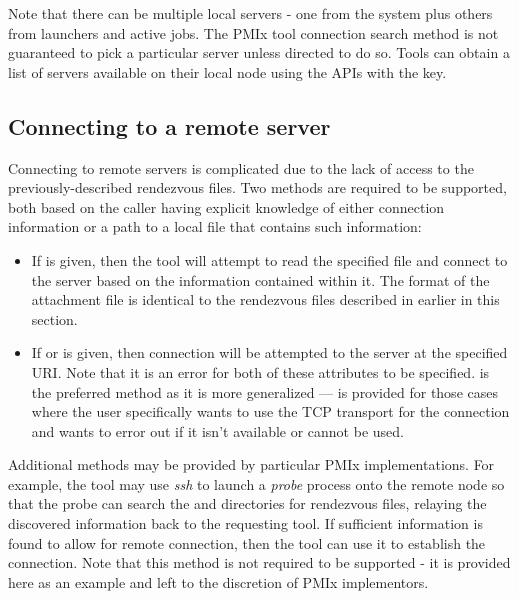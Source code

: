 Note that there can be multiple local servers - one from the system plus others from launchers and active jobs. The \ac{PMIx} tool connection search method is not guaranteed to pick a particular server unless directed to do so. Tools can obtain a list of servers available on their local node using the  \acp{API} with the  key.


\subsection{Connecting to a remote server}

Connecting to remote servers is complicated due to the lack of access to the previously-described rendezvous files. Two methods are required to be supported, both based on the caller having explicit knowledge of either connection information or a path to a local file that contains such information:


\begin{itemize}

\item If  is given, then the tool will attempt to read the specified file and connect to the server based on the information contained within it. The format of the attachment file is identical to the rendezvous files described in earlier in this section.

\item If  or  is given, then connection will be attempted to the server at the specified \ac{URI}. Note that it is an error for both of these attributes to be specified.  is the preferred method as it is more generalized —  is provided for those cases where the user specifically wants to use the \ac{TCP} transport for the connection and wants to error out if it isn’t available or cannot be used.

\end{itemize}

Additional methods may be provided by particular \ac{PMIx} implementations. For example, the tool may use \emph{ssh} to launch a \emph{probe} process onto the remote node so that the probe can search the  and  directories for rendezvous files, relaying the discovered information back to the requesting tool. If sufficient information is found to allow for remote connection, then the tool can use it to establish the connection. Note that this method is not required to be supported - it is provided here as an example and left to the discretion of \ac{PMIx} implementors.


